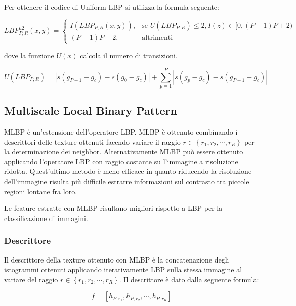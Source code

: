 Per ottenere il codice di Uniform \acs{LBP} si utilizza la formula seguente:

\begin{equation}
LBP_{P,R}^{u2}(x, y)=	
\begin{cases} 
I(LBP_{P,R}(x, y)), & \mbox{se } U(LBP_{P,R}) \le 2, I(z) \in [0, (P-1)P+2 )   \\
(P-1)P+2, & \mbox{altrimenti}
\end{cases}
\end{equation}

dove la funzione $U(x)$ calcola il numero di transizioni.

\begin{equation}
U(LBP_{P,R}) = |s( g_{P-1} - g_{c}) - s(g_{0} - g_{c}) | + \sum_{p = 1}^{P} |s(g_{p} - g_{c}) - s( g_{P-1} - g_{c}) |
\end{equation}

\subsection{Multiscale Local Binary Pattern}
\acf{MLBP} è un'estensione dell'operatore \acs{LBP}. \acs{MLBP} è ottenuto combinando i descrittori delle texture ottenuti facendo variare il raggio $r \in \left\lbrace  r_1, r_2, \cdots, r_R \right\rbrace$ per la determinazione dei neighbor. 
Alternativamente \acs{MLBP} può essere ottenuto applicando l'operatore \acs{LBP} con raggio costante su l'immagine a risoluzione ridotta. Quest'ultimo metodo è meno efficace in quanto riducendo la risoluzione dell'immagine risulta più difficile estrarre informazioni sul contrasto tra piccole regioni lontane fra loro.

Le feature estratte con \acs{MLBP} risultano migliori rispetto a \acs{LBP} per la classificazione di immagini.

\subsubsection{Descrittore}
Il descrittore della texture ottenuto con \acs{MLBP} è la concatenazione degli istogrammi ottenuti applicando iterativamente \acs{LBP} sulla stessa immagine al variare del raggio $r \in \left\lbrace  r_1, r_2, \cdots, r_R \right\rbrace$. Il descrittore è dato dalla seguente formula:

\begin{equation}
f = [h_{P, r_{1}}, h_{P, r_{2}}, \cdots, h_{P, r_R}]
\end{equation}


